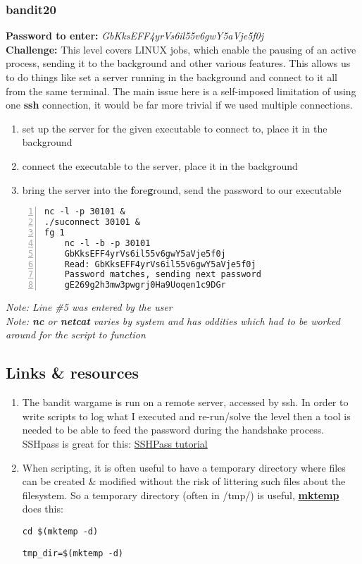 \documentclass[a4paper]{article}
\newcommand{\pass}[1]{\textbf{Password to enter:} \textit{#1}\\}
\newcommand{\chall}{\textbf{Challenge:} }
\begin{document}
\subsubsection{bandit20}
\pass{GbKksEFF4yrVs6il55v6gwY5aVje5f0j}
\chall This level covers LINUX jobs, which enable the pausing of an active process, sending it to the background and other various features. This allows us to do things like set a server running in the background and connect to it all from the same terminal. The main issue here is a self-imposed limitation of using one \textbf{ssh} connection, it would be far more trivial if we used multiple connections.
\begin{enumerate}
	\item set up the server for the given executable to connect to, place it in the background
	\item connect the executable to the server, place it in the background
	\item bring the server into the \textbf{f}ore\textbf{g}round, send the password to our executable
\end{enumerate}
\begin{lstlisting}[numbers=left]
nc -l -p 30101 &
./suconnect 30101 &
fg 1
	nc -l -b -p 30101
	GbKksEFF4yrVs6il55v6gwY5aVje5f0j
	Read: GbKksEFF4yrVs6il55v6gwY5aVje5f0j
	Password matches, sending next password
	gE269g2h3mw3pwgrj0Ha9Uoqen1c9DGr
\end{lstlisting}
\textit{Note: Line \#5 was entered by the user}\\
\textit{Note: \textbf{nc} or \textbf{netcat} varies by system and has oddities which had to be worked around for the script to function}

\subsection*{Links \& resources}
\begin{enumerate}
\item The bandit wargame is run on a remote server, accessed by ssh. In order to write scripts to log what I executed and re-run/solve the level then a tool is needed to be able to feed the password during the handshake process. SSHpass is great for this: \href{https://askubuntu.com/questions/224181/how-do-i-include-a-password-with-ssh-command-want-to-make-shell-script}{SSHPass tutorial} 

\item When scripting, it is often useful to have a temporary directory where files can be created \& modified without the risk of littering such files about the filesystem. So a temporary directory (often in /tmp/) is useful, \href{https://code-maven.com/create-temporary-directory-on-linux-using-bash}{\textbf{mktemp}} does this:
	\begin{lstlisting}[title=move to the new temporary directory]
	cd $(mktemp -d)
	\end{lstlisting}
	\begin{lstlisting}[title=store the new temporary directory path]
	tmp_dir=$(mktemp -d)
	\end{lstlisting}
\end{enumerate}
\end{document}
